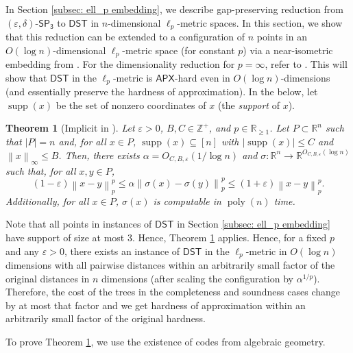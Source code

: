 \documentclass{article}\providecommand{\DeclareRedundantLanguages}[2]{}\usepackage[a4paper,margin=20mm]{geometry}
\newtheorem{theorem}{Theorem}\newtheorem{lemma}[theorem]{Lemma}\newtheorem{proposition}[theorem]{Proposition}\newtheorem{corollary}[theorem]{Corollary}\newtheorem{definition}[theorem]{Definition}\newtheorem{claim}[theorem]{Claim}\newtheorem{remark}[theorem]{Remark}\newtheorem{observation}[theorem]{Observation}\newtheorem{conjecture}[theorem]{Conjecture}\newtheorem{example}[theorem]{Example}
\DeclareMathOperator{\poly}{poly}
\DeclareMathOperator{\supp}{supp}
\newcommand{\R}{\mathbb{R}}
\newcommand{\Z}{\mathbb{Z}}
\newcommand{\1}{\textbf{1}}
\newcommand{\norm}[1]{\left\lVert#1\right\rVert}
\newcommand{\setpT}{$\mathsf{SP_3}$\xspace}
\newcommand{\dst}{$\mathsf{DST}$\xspace}
\newcommand{\apx}{$\mathsf{APX}$\xspace}
\begin{document}
In Section \ref{subsec: ell_p embedding}, we describe gap-preserving reduction from $(\varepsilon, \delta)$-\setpT to  \dst in $n$-dimensional $\ell_p$-metric spaces. In this section, we show that this reduction can be extended to a configuration of $n$ points in an $O(\log n)$-dimensional $\ell_p$-metric space (for constant $p$) via a near-isometric embedding from \cite{CK19,CKL22}. For the dimensionality reduction for $p = \infty$, refer to \cite{CK19}. This will show that \dst in the $\ell_p$-metric is \apx-hard even in $O( \log n)$-dimensions (and essentially preserve the hardness of approximation).  In the below, let $\supp(x)$ be the set of nonzero coordinates of $x$ (the \textit{support} of $x$).

\begin{theorem}[Implicit in \cite{CK19,CKL22}] \label{thm: dimensionality reduction}
Let $\varepsilon > 0$, $B, C \in \Z^+$, and $p \in \R_{\geq 1}$. Let $P \subset \R^n$ such that $|P| = n$ and, for all $x \in P$, $\supp(x)  \subseteq [n]$ with $|\supp(x)| \leq C$ and $\norm{x}_{\infty} \leq B$. Then, there exists $\alpha = O_{C,B,\varepsilon}(1/\log n)$ and $\sigma : \R^n \to \R^{O_{C,B, \varepsilon}(\log n)}$ such that, for all $x, y \in P$,
\[
(1 - \varepsilon) \norm{x - y}_p^p \leq \alpha \norm{\sigma(x) - \sigma(y)}_p^p \leq (1 + \varepsilon)\norm{x - y}_p^p.
\]
Additionally, for all $x \in P$, $\sigma(x)$ is computable in $\poly(n)$ time.
\end{theorem}
%
Note that all points in instances of \dst in Section \ref{subsec: ell_p embedding} have support of size at most $3$. Hence, Theorem \ref{thm: dimensionality reduction} applies. Hence, for a fixed $p$ and any $\varepsilon > 0$, there exists an instance of \dst in the $\ell_p$-metric in $O(\log n)$ dimensions with all pairwise distances within an arbitrarily small factor of the original distances in $n$ dimensions (after scaling the configuration by $\alpha^{1/p}$). Therefore, the cost of the trees in the completeness and soundness cases change by at most that factor and we get hardness of approximation within an arbitrarily small factor of the original hardness.

To prove Theorem \ref{thm: dimensionality reduction}, we use the existence of codes from algebraic geometry.
\end{document}
